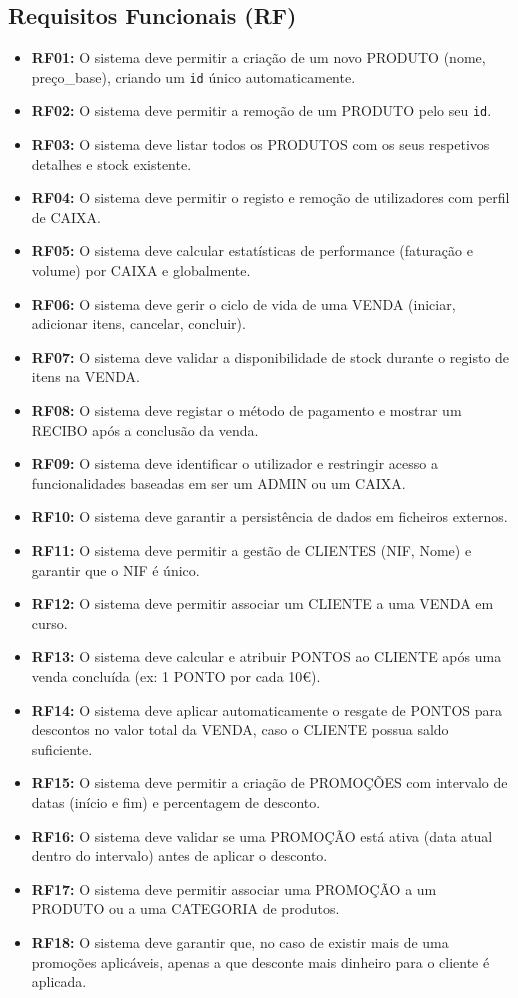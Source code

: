 \documentclass[a4paper]{llncs}
\begin{document}
\subsection{Requisitos Funcionais (RF)}
\begin{itemize}
    \item \textbf{RF01:} O sistema deve permitir a criação de um novo PRODUTO (nome, preço\_base), criando um \texttt{id} único automaticamente.
    \item \textbf{RF02:} O sistema deve permitir a remoção de um PRODUTO pelo seu \texttt{id}.
    \item \textbf{RF03:} O sistema deve listar todos os PRODUTOS com os seus respetivos detalhes e stock existente.
    \item \textbf{RF04:} O sistema deve permitir o registo e remoção de utilizadores com perfil de CAIXA.
    \item \textbf{RF05:} O sistema deve calcular estatísticas de performance (faturação e volume) por CAIXA e globalmente.
    \item \textbf{RF06:} O sistema deve gerir o ciclo de vida de uma VENDA (iniciar, adicionar itens, cancelar, concluir).
    \item \textbf{RF07:} O sistema deve validar a disponibilidade de stock durante o registo de itens na VENDA.
    \item \textbf{RF08:} O sistema deve registar o método de pagamento e mostrar um RECIBO após a conclusão da venda.
    \item \textbf{RF09:} O sistema deve identificar o utilizador e restringir acesso a funcionalidades baseadas em ser um ADMIN ou um CAIXA.
    \item \textbf{RF10:} O sistema deve garantir a persistência de dados em ficheiros externos.
    \item \textbf{RF11:} O sistema deve permitir a gestão de CLIENTES (NIF, Nome) e garantir que o NIF é único.
    \item \textbf{RF12:} O sistema deve permitir associar um CLIENTE a uma VENDA em curso.
    \item \textbf{RF13:} O sistema deve calcular e atribuir PONTOS ao CLIENTE após uma venda concluída (ex: 1 PONTO por cada 10€).
    \item \textbf{RF14:} O sistema deve aplicar automaticamente o resgate de PONTOS para descontos no valor total da VENDA, caso o CLIENTE possua saldo suficiente.
    \item \textbf{RF15:} O sistema deve permitir a criação de PROMOÇÕES com intervalo de datas (início e fim) e percentagem de desconto.
    \item \textbf{RF16:} O sistema deve validar se uma PROMOÇÃO está ativa (data atual dentro do intervalo) antes de aplicar o desconto.
    \item \textbf{RF17:} O sistema deve permitir associar uma PROMOÇÃO a um PRODUTO ou a uma CATEGORIA de produtos.
    \item \textbf{RF18:} O sistema deve garantir que, no caso de existir mais de uma promoções aplicáveis, apenas a que desconte mais dinheiro para o cliente é aplicada.
\end{itemize}
\end{document}
